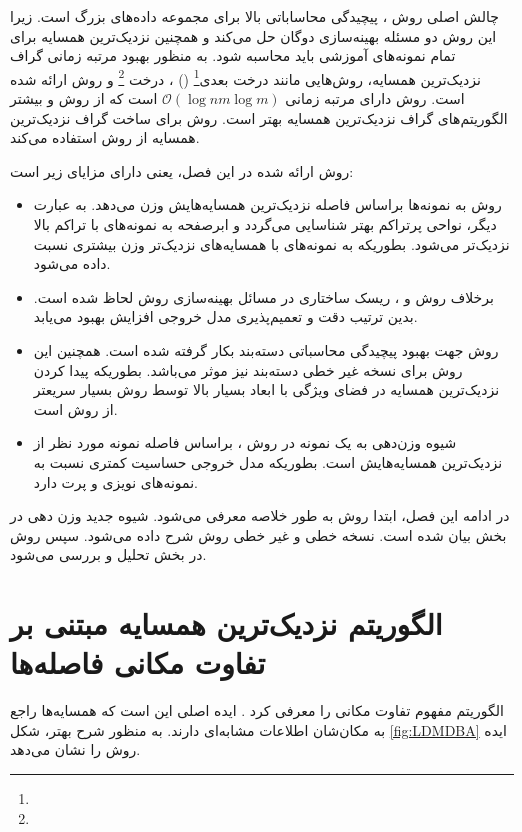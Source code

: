 چالش اصلی روش ، پیچیدگی محاساباتی بالا برای مجموعه داده‌های بزرگ است. زیرا این روش دو مسئله بهینه‌سازی دوگان حل می‌کند و همچنین  نزدیک‌ترین همسایه برای تمام نمونه‌های آموزشی باید محاسبه شود. به منظور بهبود مرتبه زمانی گراف نزدیک‌ترین همسایه، روش‌هایی مانند درخت  بعدی\footnote{}  () \cite{friedman1977}، درخت \footnote{}  \cite{chen2007} و روش  ارائه شده است. روش  دارای مرتبه زمانی  $\mathcal{O}(\log nm\log m)$ است که از روش  و بیشتر الگوریتم‌های گراف نزدیک‌ترین همسایه بهتر است. روش  برای ساخت گراف نزدیک‌ترین همسایه از روش  استفاده می‌کند.

روش ارائه شده در این فصل، یعنی  دارای مزایای زیر است:  
\begin{itemize}[label=$\bullet$]
	\item	روش  به نمونه‌ها براساس فاصله نزدیک‌ترین همسایه‌هایش وزن می‌دهد. به عبارت دیگر، نواحی پرتراکم بهتر شناسایی می‌گردد و ابرصفحه به نمونه‌های با تراکم بالا نزدیک‌تر می‌شود. بطوریکه به نمونه‌های با همسایه‌های نزدیک‌تر وزن بیشتری نسبت داده می‌شود.
	\item برخلاف روش  و ، ریسک ساختاری در مسائل بهینه‌سازی روش  لحاظ شده است. بدین ترتیب دقت و تعمیم‌پذیری مدل خروجی افزایش بهبود می‌یابد.
	\item روش  جهت بهبود پیچیدگی محاسباتی دسته‌بند بکار گرفته شده است. همچنین این روش برای نسخه غیر خطی دسته‌بند  نیز موثر می‌باشد. بطوریکه پیدا کردن  نزدیک‌ترین همسایه در فضای ویژگی با ابعاد بسیار بالا توسط روش  بسیار سریعتر از روش  است.
	\item شیوه وزن‌دهی به یک نمونه در روش ، براساس فاصله نمونه مورد نظر از نزدیک‌ترین همسایه‌هایش است. بطوریکه مدل خروجی حساسیت کمتری نسبت به نمونه‌های نویزی و پرت دارد.
\end{itemize}

در ادامه این فصل، ابتدا روش  به طور خلاصه معرفی می‌شود. شیوه جدید وزن دهی در بخش بیان شده است. نسخه خطی و غیر خطی روش  شرح داده می‌شود. سپس روش  در بخش تحلیل و بررسی می‌شود.

\section{الگوریتم نزدیک‌ترین همسایه مبتنی بر تفاوت مکانی فاصله‌ها}\label{sec:4:2}
الگوریتم  مفهوم تفاوت مکانی را معرفی کرد \cite{xia2015}. ایده اصلی این است که همسایه‌ها راجع به مکان‌شان اطلاعات مشابه‌ای دارند. به منظور شرح بهتر، شکل \ref{fig:LDMDBA}  ایده روش  را نشان می‌دهد.


